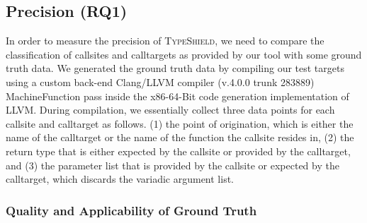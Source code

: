 \subsection{Precision (RQ1)}
\label{section:typeshieldprecision}

In order to measure the precision of \textsc{TypeShield}, we need to compare the classification of callsites and calltargets as provided by our tool with 
some ground truth data. We generated the ground truth data by compiling our test targets using a 
custom back-end Clang/LLVM compiler (v.4.0.0 trunk 283889) MachineFunction pass inside the x86-64-Bit code generation implementation of LLVM. 
During compilation, we essentially collect three data points for each callsite and calltarget as follows.
(1) the point of origination, which is either the name of the calltarget or the name of the function the callsite resides in, 
(2) the return type that is either expected by the callsite or provided by the calltarget, and 
(3) the parameter list that is provided by the callsite or expected by the calltarget, which discards the variadic argument list.

\subsubsection{Quality and Applicability of Ground Truth}
\label{subsection:typeshieldprecision}

\texttt{}

